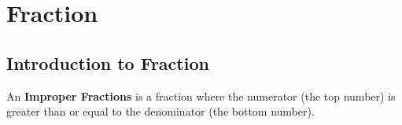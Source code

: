
\chapter{Fraction}

\section{Introduction to Fraction}

An \textbf{Improper Fractions} is a fraction where the numerator (the top number) is greater than or equal to the denominator (the bottom number).
